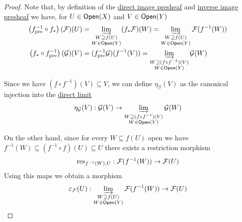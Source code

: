 \documentclass[../../../main]{subfiles}
\begin{document}
\begin{proof}
  Note that, by definition of the \hyperref[def:direct-image-presheaf]{direct image presheaf} and \hyperref[def:inverse-image-presheaf]{inverse image presheaf} we have, for \(U \in \mathsf{Open}(X)\) and \(V \in \mathsf{Open}(Y)\)
  \begin{align*}
    \left( f_{\operatorname{pre}}^{-1} \circ f_{\ast} \right)(\mathcal{F})(U) &= \varinjlim_{\substack{W \supseteq f(U) \\ W \in \mathsf{Open}(Y)}} (f_{\ast}\mathcal{F})(W) = \varinjlim_{\substack{W \supseteq f(U) \\ W \in \mathsf{Open}(Y)}} \mathcal{F}(f^{-1}(W)) \\
    \left( f_{\ast} \circ f_{\operatorname{pre}}^{-1} \right)(\mathcal{G})(V) &= (f_{\operatorname{pre}}^{-1}\mathcal{G})(f^{-1}(V)) = \varinjlim_{\substack{W \supseteq (f \circ f^{-1})(V) \\ W \in \mathsf{Open}(Y)}} \mathcal{G}(W) \end{align*}

  Since we have \((f \circ f^{-1})(V) \subseteq V\), we can define \(\eta_{\mathcal{G}}(V)\) as the canonical injection into the \hyperref[def:direct-limit]{direct limit}
  \begin{equation*}
    \eta_{\mathcal{G}}(V): \mathcal{G}(V) \to \varinjlim_{\substack{W \supseteq (f \circ f^{-1})(V) \\ W \in \mathsf{Open}(Y)}} \mathcal{G}(W)
  \end{equation*}

  On the other hand, since for every \(W \subseteq f(U)\) open we have \(f^{-1}(W) \subseteq (f^{-1} \circ f)(U) \subseteq U\) there exists a restriction morphism
  \begin{equation*}
    \operatorname{res}_{f^{-1}(W), U}: \mathcal{F}(f^{-1}(W)) \to \mathcal{F}(U)
  \end{equation*}
  Using this maps we obtain a morphism
  \begin{equation*}
    \varepsilon_{\mathcal{F}}(U): \varinjlim_{\substack{W \supseteq f(U) \\ W \in \mathsf{Open}(Y)}} \mathcal{F}(f^{-1}(W)) \to \mathcal{F}(U)
  \end{equation*}
\end{proof}
\end{document}
